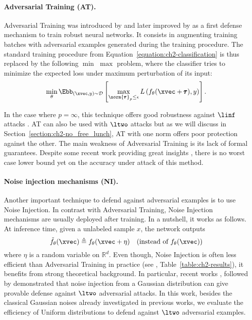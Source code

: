 \paragraph{Adversarial Training (AT).}
Adversarial Training was introduced by \citep{goodfellow2014explaining} and later improved by \citep{madry2018towards} as a first defense mechanism to train robust neural networks.
It consists in augmenting training batches with adversarial examples generated during the training procedure.
The standard training procedure from Equation~\ref{equation:ch2-classification} is thus replaced by the following  $\min$ $\max$ problem, where the classifier tries to minimize the expected loss under maximum perturbation of its input:
\begin{equation}
  \min_{\theta} \Ebb_{(\xvec, y) \sim \mathcal{D}} \left[ \max_{\norm{\pmb{\tau}}_p \leq \epsilon} L \left( f_{\theta}(\xvec + \pmb{\tau}), y \right) \right].
\end{equation}

In the case where $p=\infty$, this technique offers good robustness  against $\linf$ attacks \cite{athalye2018obfuscated}. AT can also be used with $\ltwo$ attacks but as we will discuss in Section~\ref{section:ch2-no_free_lunch}, AT with one norm offers poor protection against the other.
The main weakness of Adversarial Training is its lack of formal guarantees.
Despite some recent work providing great insights \cite{sinha2017certifying,zhang2019theoretically}, there is no worst case lower bound yet on the accuracy under attack of this method.


\paragraph{Noise injection mechanisms (NI).}
\label{subsection:ch2-randomized_training}

Another important technique to defend against adversarial examples is to use Noise Injection. 
In contrast with Adversarial Training, Noise Injection mechanisms are usually deployed after training.
In a nutshell, it works as follows.
At inference time, given a unlabeled sample $x$, the network outputs
\begin{equation}
  \tilde{f}_\theta(\xvec) \triangleq f_\theta(\xvec + \eta) \ \ \ (\text{instead of  } f_\theta(\xvec)) 
\end{equation}
where $\eta$ is a random variable on $\mathbb{R}^d$.
Even though, Noise Injection is often less efficient than Adversarial Training in practice (see \eg, Table~\ref{table:ch2-results}), it benefits from strong theoretical background.
In particular, recent works \cite{lecuyer2018certified,NIPS2019_9143}, followed by \cite{KolterRandomizedSmoothing,pinot2019theoretical} demonstrated that noise injection from a Gaussian distribution can give provable defense against $\ltwo$ adversarial attacks.
In this work, besides the classical Gaussian noises already investigated in previous works, we evaluate the efficiency of Uniform distributions to defend against $\ltwo$ adversarial examples. 


